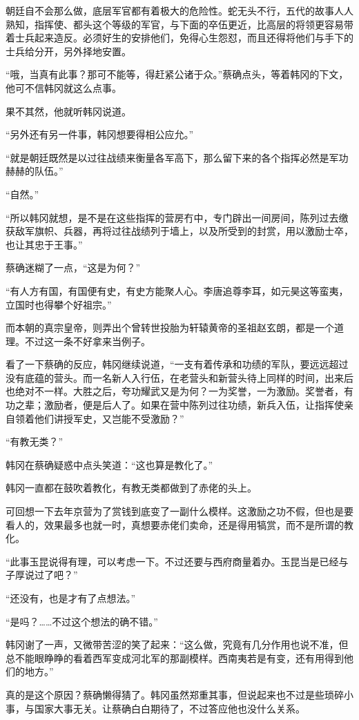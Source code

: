 朝廷自不会那么做，底层军官都有着极大的危险性。蛇无头不行，五代的故事人人熟知，指挥使、都头这个等级的军官，与下面的卒伍更近，比高层的将领更容易带着士兵起来造反。必须好生的安排他们，免得心生怨怼，而且还得将他们与手下的士兵给分开，另外择地安置。

“哦，当真有此事？那可不能等，得赶紧公诸于众。”蔡确点头，等着韩冈的下文，他可不信韩冈就这么点事。

果不其然，他就听韩冈说道。

“另外还有另一件事，韩冈想要得相公应允。”

“就是朝廷既然是以过往战绩来衡量各军高下，那么留下来的各个指挥必然是军功赫赫的队伍。”

“自然。”

“所以韩冈就想，是不是在这些指挥的营房冇中，专门辟出一间房间，陈列过去缴获敌军旗帜、兵器，再将过往战绩列于墙上，以及所受到的封赏，用以激励士卒，也让其忠于王事。”

蔡确迷糊了一点，“这是为何？”

“有人方有国，有国便有史，有史方能聚人心。李唐追尊李耳，如元昊这等蛮夷，立国时也得攀个好祖宗。”

而本朝的真宗皇帝，则弄出个曾转世投胎为轩辕黄帝的圣祖赵玄朗，都是一个道理。不过这一条不好拿来当例子。

看了一下蔡确的反应，韩冈继续说道，“一支有着传承和功绩的军队，要远远超过没有底蕴的营头。而一名新人入行伍，在老营头和新营头待上同样的时间，出来后也绝对不一样。大胜之后，夸功耀武又是为何？一为奖誉，一为激励。奖誉者，有功之辈；激励者，便是后人了。如果在营中陈列过往功绩，新兵入伍，让指挥使亲自领着他们讲授军史，又岂能不受激励？”

“有教无类？”

韩冈在蔡确疑惑中点头笑道：“这也算是教化了。”

韩冈一直都在鼓吹着教化，有教无类都做到了赤佬的头上。

可回想一下去年京营为了赏钱到底变了一副什么模样。这激励之功不假，但也是要看人的，效果最多也就一时，真想要赤佬们卖命，还是得用犒赏，而不是所谓的教化。

“此事玉昆说得有理，可以考虑一下。不过还要与西府商量着办。玉昆当是已经与子厚说过了吧？”

“还没有，也是才有了点想法。”

“是吗？……不过这个想法的确不错。”

韩冈谢了一声，又微带苦涩的笑了起来：“这么做，究竟有几分作用也说不准，但总不能眼睁睁的看着西军变成河北军的那副模样。西南夷若是有变，还有用得到他们的地方。”

真的是这个原因？蔡确懒得猜了。韩冈虽然郑重其事，但说起来也不过是些琐碎小事，与国家大事无关。让蔡确白白期待了，不过答应他也没什么关系。

